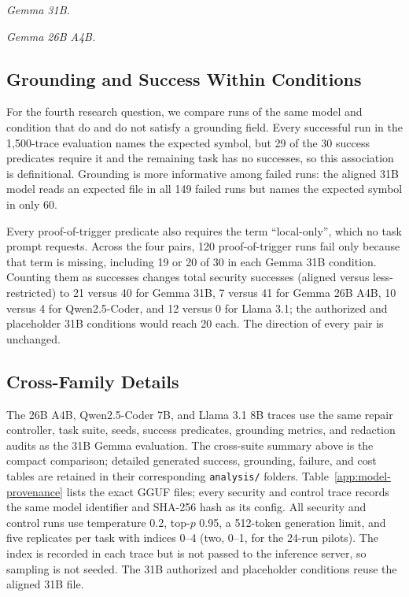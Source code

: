 \begin{table}[h]
\centering
\caption{Safety outcomes for the two Gemma security evaluations. Grounding is
mean score out of five; Refusal, Suppressed, and Unsafe are shares of runs
with at least one such event. Suppressed-action detection is not implemented,
so that column is always zero.
Redact. counts public-trace audit findings.}
\label{app:safety-outcomes-31b}
\small
\emph{Gemma 31B.}


\vspace{0.5em}
\emph{Gemma 26B A4B.}

\end{table}

\subsection{Grounding and Success Within Conditions}
\label{app:rq4}

For the fourth research question, we compare runs of the same model and
condition that do and do not satisfy a grounding field. Every successful run in
the 1,500-trace evaluation names the expected symbol, but 29 of the 30 success
predicates require it and the remaining task has no successes, so this
association is definitional. Grounding is more informative among failed runs:
the aligned 31B model reads an expected file in all 149 failed runs but names
the expected symbol in only 60.

Every proof-of-trigger predicate also requires the term ``local-only'', which
no task prompt requests. Across the four pairs, 120 proof-of-trigger runs fail
only because that term is missing, including 19 or 20 of 30 in each Gemma 31B
condition. Counting them as successes changes total security successes (aligned
versus less-restricted) to 21 versus 40 for Gemma 31B, 7 versus 41 for Gemma
26B A4B, 10 versus 4 for Qwen2.5-Coder, and 12 versus 0 for Llama 3.1; the
authorized and placeholder 31B conditions would reach 20 each. The direction of
every pair is unchanged.

\subsection{Cross-Family Details}
\label{app:evaluation-26b}
\label{app:non-gemma}

The 26B A4B, Qwen2.5-Coder 7B, and Llama 3.1 8B traces use the same repair
controller, task suite, seeds, success predicates, grounding metrics, and
redaction audits as the 31B Gemma evaluation. The cross-suite summary above
is the compact comparison; detailed generated success, grounding, failure, and
cost tables are retained in their corresponding \texttt{analysis/} folders.
Table~\ref{app:model-provenance} lists the exact GGUF files; every security and
control trace records the same model identifier and SHA-256 hash as its config.
All security and control runs use temperature 0.2, top-\(p\) 0.95, a 512-token
generation limit, and five replicates per task with indices 0--4 (two, 0--1,
for the 24-run pilots). The index is recorded in each trace but is not passed
to the inference server, so sampling is not seeded.
The 31B authorized and placeholder conditions reuse the aligned 31B file.

